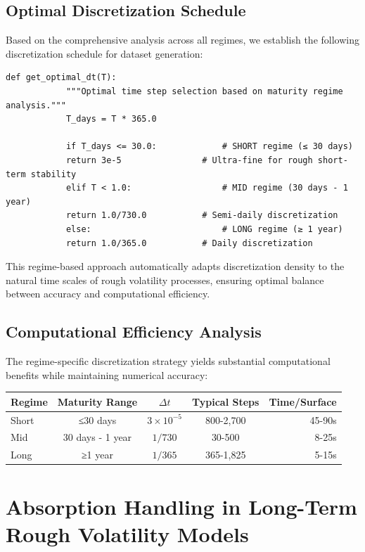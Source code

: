 	\subsection{Optimal Discretization Schedule}
	
	Based on the comprehensive analysis across all regimes, we establish the following discretization schedule for dataset generation:
	
	\begin{lstlisting}[style=cleanpy]
		def get_optimal_dt(T):
			"""Optimal time step selection based on maturity regime analysis."""
			T_days = T * 365.0
			
			if T_days <= 30.0:             # SHORT regime (≤ 30 days)
			return 3e-5                # Ultra-fine for rough short-term stability
			elif T < 1.0:                  # MID regime (30 days - 1 year)
			return 1.0/730.0           # Semi-daily discretization  
			else:                          # LONG regime (≥ 1 year)
			return 1.0/365.0           # Daily discretization
	\end{lstlisting}
	
	This regime-based approach automatically adapts discretization density to the natural time scales of rough volatility processes, ensuring optimal balance between accuracy and computational efficiency.
	
	\subsection{Computational Efficiency Analysis}
	
	The regime-specific discretization strategy yields substantial computational benefits while maintaining numerical accuracy:
	
	\begin{center}
		\begin{tabular}{@{}lcccr@{}}
			\toprule
			\textbf{Regime} & \textbf{Maturity Range} & \textbf{$\Delta t$} & \textbf{Typical Steps} & \textbf{Time/Surface} \\
			\midrule
			Short & ≤30 days & $3 \times 10^{-5}$ & 800-2,700 & 45-90s \\
			Mid & 30 days - 1 year & $1/730$ & 30-500 & 8-25s \\
			Long & ≥1 year & $1/365$ & 365-1,825 & 5-15s \\
			\bottomrule
		\end{tabular}
	\end{center}
	
	\section{Absorption Handling in Long-Term Rough Volatility Models}
	\label{sec:absorption-analysis}
	
